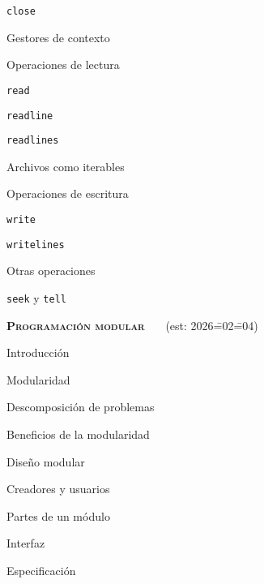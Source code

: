 \begin{longenum}
\begin{longenum}
\begin{longenum}
            \item \texttt{close}
            \item Gestores de contexto
        \end{longenum}
        \item Operaciones de lectura
        \begin{longenum}
            \item \texttt{read}
            \item \texttt{readline}
            \item \texttt{readlines}
            \item Archivos como iterables
        \end{longenum}
        \item Operaciones de escritura
        \begin{longenum}
            \item \texttt{write}
            \item \texttt{writelines}
        \end{longenum}
        \item Otras operaciones
        \begin{longenum}
            \item \texttt{seek} y \texttt{tell}
        \end{longenum}
    \end{longenum}
    \item \textbf{\textsc{Programación modular}} \ \ \ (est: 2026\==02\==04)
    \begin{longenum}
        \item Introducción
        \begin{longenum}
            \item Modularidad
            \item Descomposición de problemas
            \item Beneficios de la modularidad
        \end{longenum}
        \item Diseño modular
        \begin{longenum}
            \item Creadores y usuarios
            \item Partes de un módulo
            \begin{longenum}
                \item Interfaz
                \begin{longenum}
                    \item Especificación

\end{longenum}
\end{longenum}
\end{longenum}
\end{longenum}
\end{longenum}
